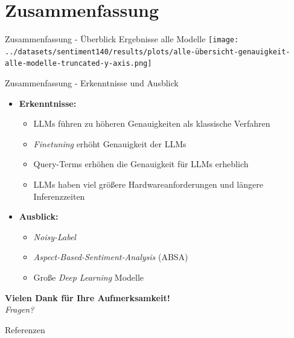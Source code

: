 \documentclass[aspectratio=169]{beamer}
\begin{document}
\section{Zusammenfassung}

\begin{frame}{Zusammenfassung - Überblick Ergebnisse alle Modelle}
	\centering
	\texttt{[image: ../datasets/sentiment140/results/plots/alle-übersicht-genauigkeit-alle-modelle-truncated-y-axis.png]}
\end{frame}

\begin{frame}{Zusammenfassung - Erkenntnisse und Ausblick}
	\normalsize
	\begin{itemize}
		\item \textbf{Erkenntnisse:}
		      \begin{itemize}
			      \item LLMs führen zu höheren Genauigkeiten als klassische Verfahren
			      \item \textit{Finetuning} erhöht Genauigkeit der LLMs
			      \item Query-Terms erhöhen die Genauigkeit für LLMs erheblich
			      \item LLMs haben viel größere Hardwareanforderungen und längere Inferenzzeiten
		      \end{itemize}
		      \vspace{0.4cm}
		\item \textbf{Ausblick:}
		      \begin{itemize}
			      \item \textit{Noisy-Label}
			      \item \textit{Aspect-Based-Sentiment-Analysis} (ABSA)
			      \item Große \textit{Deep Learning} Modelle
		      \end{itemize}
	\end{itemize}

	\vspace{0.5cm}
	\centering
	\pause
	{\large \textbf{Vielen Dank für Ihre Aufmerksamkeit!}} \\[0.1cm]
	\textit{Fragen?}
\end{frame}


\begin{frame}{Referenzen} 
    
	\printbibliography
	\nocite{*}
	
\end{frame}
\end{document}
